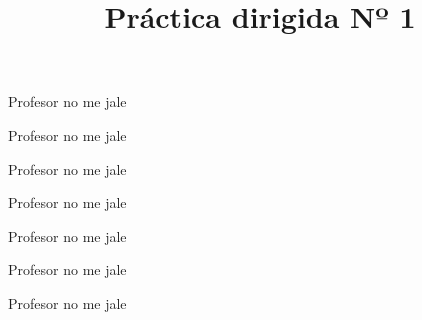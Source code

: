 \documentclass{homeworksm}
\begin{document}
  \title{Práctica dirigida Nº 1}
  \maketitle

  \begin{problem}
    Profesor no me jale
  \end{problem}

  \begin{problem}
    Profesor no me jale
  \end{problem}

  \begin{problem}
    Profesor no me jale
  \end{problem}

  \begin{problem}
    Profesor no me jale
  \end{problem}

  \begin{problem}
    Profesor no me jale
  \end{problem}

  \begin{problem}
    Profesor no me jale
  \end{problem}

  \begin{problem}
    Profesor no me jale
  \end{problem}
\end{document}

